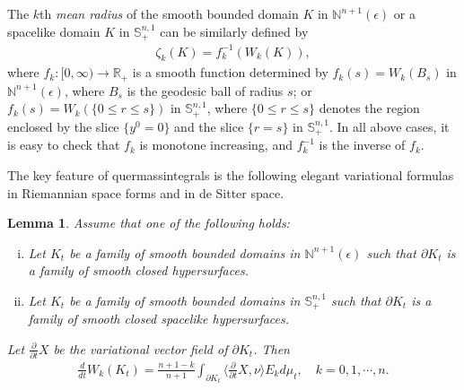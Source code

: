 \documentclass[11pt,reqno]{amsart}
\newtheorem{lem}[thm]{Lemma}
\theoremstyle{definition}
\theoremstyle{remark}
\numberwithin{equation}{section}
\renewcommand{\(}{\left(}
\renewcommand{\)}{\right)}
\renewcommand{\~}{\tilde}
\renewcommand{\-}{\overline}
\newcommand{\e}{\epsilon}
\newcommand{\ra}{\rightarrow}
\begin{document}
The $k$th {\em mean radius} of the smooth bounded domain $K$ in $\mathbb N^{n+1}(\e)$ or a spacelike domain $K$ in $\mathbb S^{n,1}_{+}$ can be similarly defined by
\begin{align}\label{s3:def-mean-radius-spaceforms}
\zeta_k(K)=f_k^{-1}(W_k(K)),
\end{align}
where $f_k:[0,\infty)\ra \mathbb R_{+}$ is a smooth function determined by $f_k(s)=W_k(B_s)$ in $\mathbb N^{n+1}(\e)$, where $B_s$ is the geodesic ball of radius $s$; or $f_k(s)=W_k(\{0\leq r\leq s\})$ in $\mathbb S^{n,1}_{+}$, where $\{0\leq r\leq s\}$ denotes the region enclosed by the slice $\{y^0=0\}$ and the slice $\{r=s\}$ in $\mathbb S_+^{n,1}$. In all above cases, it is easy to check that $f_k$ is monotone increasing, and $f_k^{-1}$ is the inverse of $f_k$. 

The key feature of quermassintegrals is the following elegant variational formulas in Riemannian space forms and in de Sitter space.
\begin{lem}
	Assume that one of the following holds:
	\begin{enumerate}[(i)]
		\item Let $K_t$ be a family of smooth bounded domains in $\mathbb N^{n+1}(\e)$ such that $\partial K_t$ is a family of smooth closed hypersurfaces. 
		\item Let $K_t$ be a family of smooth bounded domains in $\mathbb S^{n,1}_{+}$ such that $\partial K_t$ is a family of smooth closed spacelike hypersurfaces.
    \end{enumerate}
    Let $\frac{\partial}{\partial t}X$ be the variational vector field of $\partial K_t$. Then 
	\begin{align}\label{s3:variational-formula}
	\frac{d}{dt}W_k(K_t)=\frac{n+1-k}{n+1}\int_{\partial K_t} \langle \frac{\partial}{\partial t}X,\nu \rangle E_k d\mu_t, \quad k=0,1,\cdots,n.
	\end{align}	
\end{lem}
\end{document}
